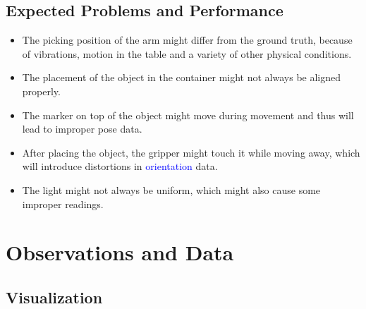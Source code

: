 \documentclass[10pt,a4paper]{article}
\begin{document}
				\subsection{Expected Problems and Performance}
					\begin{itemize}
						\item The picking position of the arm might differ from the ground truth, because of vibrations, motion in the table and a variety of other physical conditions.
						\item The placement of the object in the container might not always be aligned properly.
						\item The marker on top of the object might move during movement and thus will lead to improper pose data.
						\item After placing the object, the gripper might touch it while moving away, which will introduce distortions in \textcolor{blue}{orientation} data.
						\item The light might not always be uniform, which might also cause some improper readings.						
					\end{itemize}
					
				\section{Observations and Data}
					 \subsection{Visualization}
\end{document}
